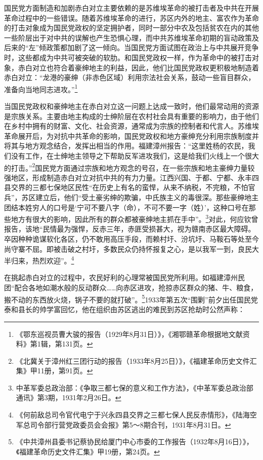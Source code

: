 国民党方面制造和加剧赤白对立主要依赖的是苏维埃革命的被打击者及中共在开展革命过程中的一些错误。随着苏维埃革命的进行，苏区内外的地主、富农作为革命的打击对象成为国民党政权的坚定拥护者，同时一部分中农及包括贫农在内的其他一些阶层出于对中共的误解也产生恐惧心理，而中共苏维埃革命初期的盲动政策及后来的“左”倾政策都加剧了这一倾向。当国民党方面试图在政治上与中共展开竞争时，这些都成为中共可被突破的软肋。和国民党政权一样，作为革命中的被打击对象，赤白对立也符合着豪绅地主的利益，因此，他们比国民党政权更积极地制造着赤白对立：“龙港的豪绅（非赤色区域）利用宗法社会关系，鼓动一些盲目群众，准备向当地同志进攻。”\footnote{《鄂东巡视员曹大骏的报告（1929年8月31日）》，《湘鄂赣革命根据地文献资料》第1辑，第131页。}


当国民党政权和豪绅地主在赤白对立这一问题上达成一致时，他们最常动用的资源是宗族关系。主要由地主构成的士绅阶层在农村社会具有重要的影响力，由于他们在乡村中拥有的财富、文化、社会资源，通常成为宗族的控制者和代言人。苏维埃革命展开后，为对抗中共革命的影响，国民党政权和地方豪绅充分利用宗族制度并将其与地方观念结合，发挥出相当的作用。福建漳州报告：“这里姓杨的农民，我们没有工作，在士绅地主领导之下帮助反军进攻我们，这是给我们火线上一个很大的打击。”\footnote{《北冀关于漳州红三团行动的报告（1933年8月25日）》，《福建革命历史文件汇集》甲11册，第91页。}国民党方面通过宗族和地方观念的号召，在一些宗族和地主豪绅力量较强地区，形成制造赤白对立对抗中共的有力力量。江西兴国、于都、宁都、永丰四县交界的三都七保地区民性“在历史上有名的蛮悍，从来不纳税，不完粮，不怕官兵”，苏区建立后，他们“受土豪劣绅的欺骗，中氏族主义的毒很深。那些豪绅地主团结本姓穷人的口号是‘宁可不要八字（命），不可不要一字（姓）’，这种口号在那些地方有很大的影响，因此所有的群众都被豪绅地主抓在手中”。\footnote{中革军委总政治部：《争取三都七保的意义和工作方法》，《中革军委总政治部通讯》第3期，1931年2月26日。}对此，何应钦曾报告，该地“民情最为强悍，反赤三年，赤匪受损甚大，视为赣南赤区最大障碍。卒因种种诡谋软化各区，仍不敢用高压手段，而赖村圩、汾坑圩、马鞍石等处至今尚守寨不屈。即被击破之村圩，多数民众仍持怀报复之心，是以我军一到，良民大半归来，热烈欢迎”。\footnote{《何前敌总司令官代电宁于兴永四县交界之三都七保人民反赤情形》，《陆海空军总司令部行营党政委员会会报》第5～8期合刊，1931年8月31日。}


在挑起赤白对立的过程中，农民好利的心理常被国民党所利用。如福建漳州民团“配合各地如潮水般的反动群众……向赤区进攻，抢掠赤区群众的猪、牛、粮食，搬不动的东西放火烧，锅子不要的就打破”。\footnote{《中共漳州县委书记蔡协民给厦门中心市委的工作报告（1932年8月16日）》，《福建革命历史文件汇集》甲19册，第24页。}1933年第五次“围剿”前夕出任国民党泰和县长的帅学富回忆，他在组织由苏区逃出的难民到苏区抢劫时公然声称：

